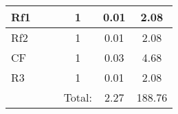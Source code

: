 \begin{table}
\begin{tabular}{|l|l|l|c|c|c|}
\hline
Rf1                  &                      &                    & 1                           & 0.01                            & 2.08                                     \\ 
\hline
Rf2                  &                      &                    & 1                           & 0.01                            & 2.08                                     \\ 
\hline
CF                   &                      &                    & 1                           & 0.03                            & 4.68                                     \\ 
\hline
R3                   &                      &                    & 1                           & 0.01                            & 2.08                                     \\ 
\hline
\multicolumn{1}{l}{} & \multicolumn{1}{l}{} &                    & \multicolumn{1}{l|}{Total:} & 2.27                            & 188.76                                   \\
\cline{4-6}
\end{tabular}
\end{table}